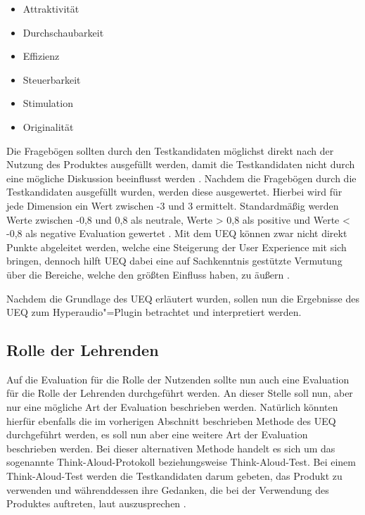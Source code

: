 \begin{itemize}
\item Attraktivität
\item Durchschaubarkeit
\item Effizienz
\item Steuerbarkeit
\item Stimulation
\item Originalität
\end{itemize}

Die Fragebögen sollten durch den Testkandidaten möglichst direkt nach der Nutzung des Produktes ausgefüllt werden, damit die Testkandidaten nicht durch eine mögliche Diskussion beeinflusst werden \citep{schrepp2018user}. Nachdem die Fragebögen durch die Testkandidaten ausgefüllt wurden, werden diese ausgewertet. Hierbei wird für jede Dimension ein Wert zwischen -3 und 3 ermittelt. Standardmäßig werden Werte zwischen -0,8 und 0,8 als neutrale, Werte > 0,8 als positive und Werte < -0,8 als negative Evaluation gewertet \citep{schrepp2018user}. Mit dem UEQ können zwar nicht direkt Punkte abgeleitet werden, welche eine Steigerung der User Experience mit sich bringen, dennoch hilft UEQ dabei eine auf Sachkenntnis gestützte Vermutung über die Bereiche, welche den größten Einfluss haben, zu äußern  \citep{schrepp2018user}.

Nachdem die Grundlage des UEQ erläutert wurden, sollen nun die Ergebnisse des UEQ zum Hyperaudio"=Plugin betrachtet und interpretiert werden.



\subsection{Rolle der Lehrenden}
Auf die Evaluation für die Rolle der Nutzenden sollte nun auch eine Evaluation für die Rolle der Lehrenden durchgeführt werden. An dieser Stelle soll nun, aber nur eine mögliche Art der Evaluation beschrieben werden. Natürlich könnten hierfür ebenfalls die im vorherigen Abschnitt beschrieben Methode des UEQ durchgeführt werden, es soll nun aber eine weitere Art der Evaluation beschrieben werden. Bei dieser alternativen Methode handelt es sich um das sogenannte Think-Aloud-Protokoll beziehungsweise Think-Aloud-Test. Bei einem Think-Aloud-Test werden die Testkandidaten darum gebeten, das Produkt zu verwenden und währenddessen ihre Gedanken, die bei der Verwendung des Produktes auftreten, laut auszusprechen \citep{nielsen2012thinking}.




